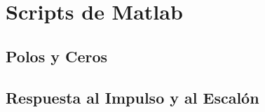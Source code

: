 \chapter{Scripts de Matlab}
\section{Polos y Ceros}
\begin{figure}[H]
  
\end{figure}

\section{Respuesta al Impulso y al Escalón}
\begin{figure}[H]
  
\end{figure}